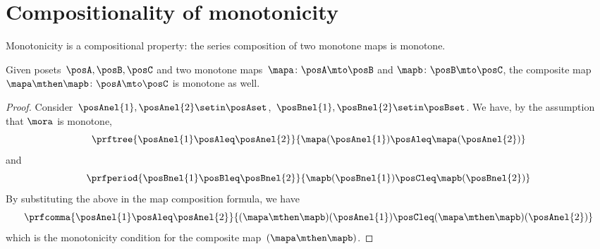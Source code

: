 
\section{Compositionality of monotonicity}
Monotonicity is a compositional property: the series composition of two monotone maps is monotone.
\begin{lemma}
    Given posets~$\posA,\posB,\posC$ and two monotone maps~$\mapa\colon \posA \mto \posB$ and $\mapb\colon \posB \mto \posC$, the composite map~$\mapa\mthen \mapb\colon \posA \mto \posC$ is monotone as well.
\end{lemma}
\begin{proof}
    Consider~$\posAnel{1},\posAnel{2} \setin \posAset$,~$\posBnel{1},\posBnel{2}\setin \posBset$.
    We have, by the assumption that $\mora$ is monotone,
    \begin{equation}
        \prftree{\posAnel{1}\posAleq \posAnel{2}}{\mapa(\posAnel{1})\posAleq \mapa(\posAnel{2})}
    \end{equation}
    and
    \begin{equation}
        \prfperiod{\posBnel{1}\posBleq \posBnel{2}}{\mapb(\posBnel{1})\posCleq \mapb(\posBnel{2})}
    \end{equation}
    By substituting the above in the map composition formula, we have
    \begin{equation}
        \prfcomma{\posAnel{1}\posAleq \posAnel{2} }{ (\mapa\mthen \mapb)(\posAnel{1}) \posCleq (\mapa\mthen \mapb)(\posAnel{2})}
    \end{equation}
    which is the monotonicity condition for the composite map~$(\mapa\mthen\mapb)$.
\end{proof}
